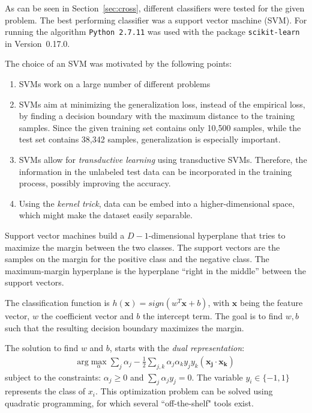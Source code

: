 \documentclass{article}
\begin{document}
As can be seen in Section~\ref{sec:cross}, different classifiers were
tested for the given problem. The best performing classifier was a support
vector machine (SVM). For running the algorithm \texttt{Python~2.7.11}
was used with the package \texttt{scikit-learn} in Version~0.17.0.

The choice of an SVM was motivated by the following points:

\begin{enumerate}
\item SVMs work on a large number of different problems
\item SVMs aim at minimizing the generalization loss, instead of the empirical loss, by finding a decision boundary with the maximum distance to the training samples. Since the given training set contains only 10,500 samples, while the test set contains 38,342 samples, generalization is especially important.
\item SVMs allow for \emph{transductive learning} using transductive SVMs. Therefore, the information in the unlabeled test data can be incorporated in the training process, possibly improving the accuracy.
\item Using the \emph{kernel trick}, data can be embed into a higher-dimensional space, which might make the dataset easily separable.
\end{enumerate}

Support vector machines build a $D-1$-dimensional hyperplane that
tries to maximize the margin between the two classes. The support
vectors are the samples on the margin for the positive class and the
negative class. The maximum-margin hyperplane is the hyperplane
``right in the middle'' between the support vectors.

The classification function is $h(\mathbf{x}) = sign(w^T\mathbf{x} + b)$, with $\mathbf{x}$ being the feature vector, $w$
the coefficient vector and $b$ the intercept term. The
goal is to find $w, b$ such that the resulting decision boundary
maximizes the margin.

The solution to find $w$ and $b$, starts with the \emph{dual representation}:
\begin{align}
\label{eq:dual}
\text{arg}\max_\alpha\sum_j\alpha_j - \frac{1}{2}\sum_{j,k}\alpha_j\alpha_ky_jy_k(\mathbf{x_j} \cdot \mathbf{x_k})
\end{align} subject to the constraints: $\alpha_j \geq 0$ and $\sum_j\alpha_jy_j=0$. The variable $y_i \in \{-1, 1\}$ represents the class of $x_i$. This optimization problem can be solved using quadratic programming, for which several ``off-the-shelf" tools exist.
\end{document}
